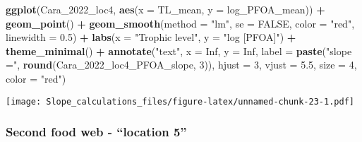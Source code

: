 \documentclass[
]{article}
\newenvironment{Shaded}{\begin{snugshade}}{\end{snugshade}}
\newcommand{\AttributeTok}[1]{\textcolor[rgb]{0.13,0.29,0.53}{#1}}
\newcommand{\ConstantTok}[1]{\textcolor[rgb]{0.56,0.35,0.01}{#1}}
\newcommand{\DecValTok}[1]{\textcolor[rgb]{0.00,0.00,0.81}{#1}}
\newcommand{\FloatTok}[1]{\textcolor[rgb]{0.00,0.00,0.81}{#1}}
\newcommand{\FunctionTok}[1]{\textcolor[rgb]{0.13,0.29,0.53}{\textbf{#1}}}
\newcommand{\NormalTok}[1]{#1}
\newcommand{\SpecialCharTok}[1]{\textcolor[rgb]{0.81,0.36,0.00}{\textbf{#1}}}
\newcommand{\StringTok}[1]{\textcolor[rgb]{0.31,0.60,0.02}{#1}}
\begin{document}
\begin{Shaded}
\begin{Highlighting}[]
\FunctionTok{ggplot}\NormalTok{(Cara\_2022\_loc4, }\FunctionTok{aes}\NormalTok{(}\AttributeTok{x =}\NormalTok{ TL\_mean, }\AttributeTok{y =}\NormalTok{ log\_PFOA\_mean)) }\SpecialCharTok{+}
  \FunctionTok{geom\_point}\NormalTok{() }\SpecialCharTok{+}
  \FunctionTok{geom\_smooth}\NormalTok{(}\AttributeTok{method =} \StringTok{"lm"}\NormalTok{, }\AttributeTok{se =} \ConstantTok{FALSE}\NormalTok{, }\AttributeTok{color =} \StringTok{"red"}\NormalTok{, }\AttributeTok{linewidth =} \FloatTok{0.5}\NormalTok{) }\SpecialCharTok{+}
  \FunctionTok{labs}\NormalTok{(}\AttributeTok{x =} \StringTok{"Trophic level"}\NormalTok{,}
       \AttributeTok{y =} \StringTok{"log [PFOA]"}\NormalTok{) }\SpecialCharTok{+}
  \FunctionTok{theme\_minimal}\NormalTok{() }\SpecialCharTok{+}
  \FunctionTok{annotate}\NormalTok{(}\StringTok{"text"}\NormalTok{, }\AttributeTok{x =} \ConstantTok{Inf}\NormalTok{, }\AttributeTok{y =} \ConstantTok{Inf}\NormalTok{, }\AttributeTok{label =} \FunctionTok{paste}\NormalTok{(}\StringTok{"slope ="}\NormalTok{, }\FunctionTok{round}\NormalTok{(Cara\_2022\_loc4\_PFOA\_slope, }\DecValTok{3}\NormalTok{)), }
           \AttributeTok{hjust =} \DecValTok{3}\NormalTok{, }\AttributeTok{vjust =} \FloatTok{5.5}\NormalTok{, }\AttributeTok{size =} \DecValTok{4}\NormalTok{, }\AttributeTok{color =} \StringTok{"red"}\NormalTok{)}
\end{Highlighting}
\end{Shaded}

\texttt{[image: Slope\_calculations\_files/figure-latex/unnamed-chunk-23-1.pdf]}

\subsubsection{Second food web - ``location
5''}\label{second-food-web---location-5}
\end{document}
